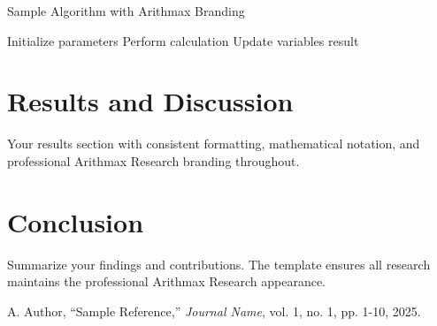 \documentclass[twocolumn,ieee]{arithmaxresearch}
\begin{document}
\begin{algorithm}
\caption{Sample Algorithm with Arithmax Branding}
\begin{algorithmic}[1]
\STATE Initialize parameters
    \STATE Perform calculation
    \STATE Update variables
\ENDFOR
\RETURN result
\end{algorithmic}
\end{algorithm}

\section{Results and Discussion}

Your results section with consistent formatting, mathematical notation, and professional Arithmax Research branding throughout.

\section{Conclusion}

Summarize your findings and contributions. The template ensures all research maintains the professional Arithmax Research appearance.

\begin{thebibliography}{9}
A. Author, ``Sample Reference,'' \emph{Journal Name}, vol. 1, no. 1, pp. 1-10, 2025.
\end{thebibliography}
\end{document}
